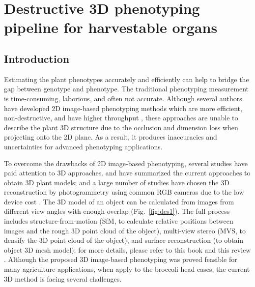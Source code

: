\chapter{Destructive 3D phenotyping pipeline for harvestable organs}

\section{Introduction}

Estimating the plant phenotypes accurately and efficiently can help to bridge the gap between genotype and phenotype. The traditional phenotyping measurement is time-consuming, laborious, and often not accurate. Although several authors have developed 2D image-based phenotyping methods which are more efficient, non-destructive, and have higher throughput \citep{yang_greenness_2015,guo_easypcc_2017,zou_broccoli_2019}, these approaches are unable to describe the plant 3D structure due to the occlusion and dimension loss when projecting onto the 2D plane. As a result, it produces inaccuracies and uncertainties for advanced phenotyping applications.

To overcome the drawbacks of 2D image-based phenotyping, several studies have paid attention to 3D approaches. \citet{paulus_measuring_2019} and \citet{kochi_introduction_2021} have summarized the current approaches to obtain 3D plant models; and a large number of studies have chosen the 3D reconstruction by photogrammetry using common RGB cameras due to the low device cost \citep{xiao_estimating_2021,zermas_3d_2020,zhang_estimating_2016}. The 3D model of an object can be calculated from images from different view angles with enough overlap (Fig.~\ref{fig:des1}). The full process includes structure-from-motion (SfM, to calculate relative positions between images and the rough 3D point cloud of the object), multi-view stereo (MVS, to densify the 3D point cloud of the object), and surface reconstruction (to obtain object 3D mesh model); for more details, please refer to this book \citep{hartley_multiple_2000} and this review \citep{snavely_scene_2010}. Although the proposed 3D image-based phenotyping was proved feasible for many agriculture applications, when apply to the broccoli head cases, the current 3D method is facing several challenges.



